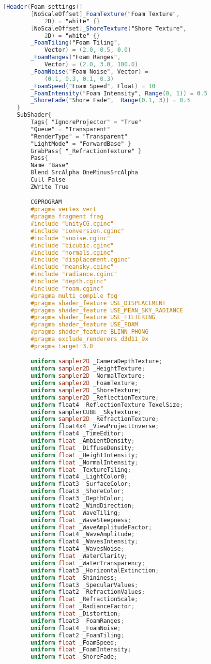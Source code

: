 \begin{lstlisting}[language=GLSL, caption={\label{cf:agua} Shader de efeito de água na Unity}]
		[Header(Foam settings)]
		[NoScaleOffset]_FoamTexture("Foam Texture", 
			2D) = "white" {}
		[NoScaleOffset]_ShoreTexture("Shore Texture", 
			2D) = "white" {}
		_FoamTiling("Foam Tiling", 
			Vector) = (2.0, 0.5, 0.0)
		_FoamRanges("Foam Ranges", 
			Vector) = (2.0, 3.0, 100.0)
		_FoamNoise("Foam Noise", Vector) = 
			(0.1, 0.3, 0.1, 0.3)
		_FoamSpeed("Foam Speed", Float) = 10
		_FoamIntensity("Foam Intensity", Range(0, 1)) = 0.5
		_ShoreFade("Shore Fade",  Range(0.1, 3)) = 0.3
	} 
	SubShader{
		Tags{ "IgnoreProjector" = "True"
		"Queue" = "Transparent"
		"RenderType" = "Transparent"
		"LightMode" = "ForwardBase" }
		GrabPass{ "_RefractionTexture" }
		Pass{
		Name "Base"
		Blend SrcAlpha OneMinusSrcAlpha
		Cull False
		ZWrite True

		CGPROGRAM
		#pragma vertex vert
		#pragma fragment frag
		#include "UnityCG.cginc"
		#include "conversion.cginc"
		#include "snoise.cginc"
		#include "bicubic.cginc"
		#include "normals.cginc"
		#include "displacement.cginc"
		#include "meansky.cginc"
		#include "radiance.cginc"
		#include "depth.cginc"
		#include "foam.cginc"
		#pragma multi_compile_fog
		#pragma shader_feature USE_DISPLACEMENT
		#pragma shader_feature USE_MEAN_SKY_RADIANCE
		#pragma shader_feature USE_FILTERING
		#pragma shader_feature USE_FOAM
		#pragma shader_feature BLINN_PHONG
		#pragma exclude_renderers d3d11_9x 
		#pragma target 3.0

		uniform sampler2D _CameraDepthTexture;
		uniform sampler2D _HeightTexture;
		uniform sampler2D _NormalTexture;
		uniform sampler2D _FoamTexture;
		uniform sampler2D _ShoreTexture;
		uniform sampler2D _ReflectionTexture; 
		uniform float4 _ReflectionTexture_TexelSize;
		uniform samplerCUBE _SkyTexture;
		uniform sampler2D _RefractionTexture;
		uniform float4x4 _ViewProjectInverse;
		uniform float4 _TimeEditor;
		uniform float _AmbientDensity;
		uniform float _DiffuseDensity;
		uniform float _HeightIntensity;
		uniform float _NormalIntensity;
		uniform float _TextureTiling;
		uniform float4 _LightColor0;
		uniform float3 _SurfaceColor;
		uniform float3 _ShoreColor;
		uniform float3 _DepthColor;
		uniform float2 _WindDirection;
		uniform float _WaveTiling;
		uniform float _WaveSteepness;
		uniform float _WaveAmplitudeFactor;
		uniform float4 _WaveAmplitude;
		uniform float4 _WavesIntensity;
		uniform float4 _WavesNoise;
		uniform float _WaterClarity;
		uniform float _WaterTransparency;
		uniform float3 _HorizontalExtinction;
		uniform float _Shininess;
		uniform float3 _SpecularValues;
		uniform float2 _RefractionValues;
		uniform float _RefractionScale;
		uniform float _RadianceFactor;
		uniform float _Distortion;
		uniform float3 _FoamRanges;
		uniform float4 _FoamNoise;
		uniform float2 _FoamTiling;
		uniform float _FoamSpeed;
		uniform float _FoamIntensity;
		uniform float _ShoreFade;


\end{lstlisting}

